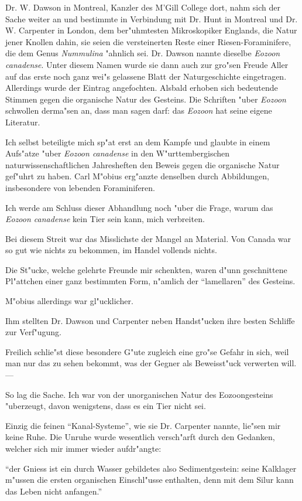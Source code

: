 \documentclass[a4paper, 11pt, oneside, german]{article}
\begin{document}
Dr. W. Dawson in Montreal, Kanzler des M'Gill College dort, nahm sich der Sache weiter an und bestimmte in Verbindung mit Dr. Hunt in Montreal und Dr. W. Carpenter in London, dem ber"uhmtesten Mikroskopiker Englands, die Natur jener Knollen dahin, sie seien die versteinerten Reste einer Riesen-Foraminifere, die dem Genus \emph{Nummulina} "ahnlich sei. Dr. Dawson nannte dieselbe \emph{Eozoon canadense}. Unter diesem Namen wurde sie dann auch zur gro"sen Freude Aller auf das erste noch ganz wei"s gelassene Blatt der Naturgeschichte eingetragen. Allerdings wurde der Eintrag angefochten. Alsbald erhoben sich bedeutende Stimmen gegen die organische Natur des Gesteins. Die Schriften "uber \emph{Eozoon} schwollen derma"sen an, dass man sagen darf: das \emph{Eozoon} hat seine eigene Literatur.

Ich selbst beteiligte mich sp"at erst an dem Kampfe und glaubte in einem Aufs"atze "uber \emph{Eozoon canadense} in den W"urttembergischen naturwissenschaftlichen Jahresheften den Beweis gegen die organische Natur gef"uhrt zu haben. Carl M"obius erg"anzte denselben durch Abbildungen, insbesondere von lebenden Foraminiferen.

Ich werde am Schluss dieser Abhandlung noch "uber die Frage, warum das \emph{Eozoon canadense} kein Tier sein kann, mich verbreiten.

Bei diesem Streit war das Misslichste der Mangel an Material. Von Canada war so gut wie nichts zu bekommen, im Handel vollends nichts.

Die St"ucke, welche gelehrte Freunde mir schenkten, waren d"unn geschnittene Pl"attchen einer ganz bestimmten Form, n"amlich der "`lamellaren"' des Gesteins.

M"obius allerdings war gl"ucklicher.

Ihm stellten Dr. Dawson und Carpenter neben Handst"ucken ihre besten Schliffe zur Verf"ugung.

Freilich schlie"st diese besondere G"ute zugleich eine gro"se Gefahr in sich, weil man nur das zu sehen bekommt, was der Gegner als Beweisst"uck verwerten will. ---

So lag die Sache. Ich war von der unorganischen Natur des Eozoongesteins "uberzeugt, davon wenigstens, dass es ein Tier nicht sei.

Einzig die feinen "`Kanal-Systeme"', wie sie Dr. Carpenter nannte, lie"sen mir keine Ruhe. Die Unruhe wurde wesentlich versch"arft durch den Gedanken, welcher sich mir immer wieder aufdr"angte:

"`der Gniess ist ein durch Wasser gebildetes also Sedimentgestein: seine Kalklager m"ussen die ersten organischen Einschl"usse enthalten, denn mit dem Silur kann das Leben nicht anfangen."'
\end{document}
